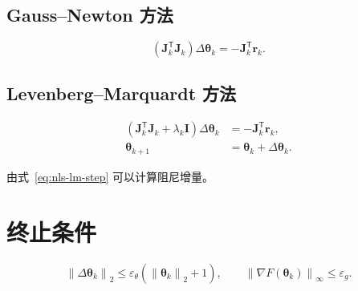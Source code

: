 \documentclass[UTF8]{ctexart}
\begin{document}
\subsection{Gauss--Newton 方法}

\begin{equation}
\left(\bm J_k^{\mathsf T}\bm J_k\right)
\Delta\bm\theta_k
=
-\bm J_k^{\mathsf T}\bm r_k.
\label{eq:nls-gn}
\end{equation}

\subsection{Levenberg--Marquardt 方法}

\begin{subequations}
\label{eq:nls-lm-system}
\begin{align}
\left(\bm J_k^{\mathsf T}\bm J_k+\lambda_k\bm I\right)
\Delta\bm\theta_k
&=
-\bm J_k^{\mathsf T}\bm r_k,
\label{eq:nls-lm-step}\\
\bm\theta_{k+1}
&=
\bm\theta_k+\Delta\bm\theta_k.
\label{eq:nls-update}
\end{align}
\end{subequations}

由式~\eqref{eq:nls-lm-step} 可以计算阻尼增量。

\section{终止条件}

\begin{equation}
\left\|\Delta\bm\theta_k\right\|_2
\leq
\varepsilon_{\theta}
\left(\left\|\bm\theta_k\right\|_2+1\right),
\qquad
\left\|\nabla F(\bm\theta_k)\right\|_{\infty}
\leq
\varepsilon_g.
\label{eq:nls-stopping}
\end{equation}
\end{document}
